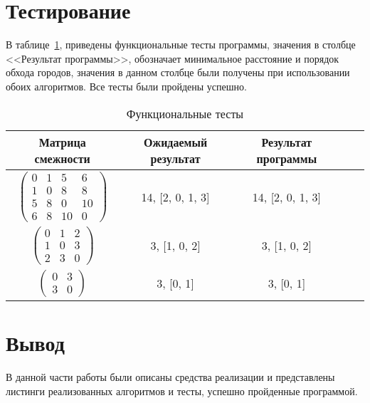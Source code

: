 \section{Тестирование}
В таблице~\ref{t:func_t}, приведены функциональные тесты программы,
значения в столбце <<Результат программы>>, обозначает минимальное расстояние и порядок обхода городов, значения в данном столбце были получены при использовании обоих алгоритмов. Все тесты были пройдены успешно.
\begin{center}
	\captionsetup{justification=raggedright,singlelinecheck=off}
	\begin{longtable}[c]{|c|c|c|c|c|}
		\caption{Функциональные тесты\label{t:func_t}} \\ \hline
		Матрица смежности & Ожидаемый результат & Результат программы \\
		\hline
		$ \begin{pmatrix}
		 0 &  1  & 5 &  6\\
		1  & 0  & 8  & 8\\
		5  & 8 &  0 & 10\\
		6  & 8 & 10 &  0
		
		\end{pmatrix}$ &
		14, [2, 0, 1, 3] &
		14, [2, 0, 1, 3] \\
		
		$ \begin{pmatrix}
			0 & 1 & 2 \\
			1 & 0 & 3 \\
			2 & 3 & 0	
		\end{pmatrix}$ &
		3, [1, 0, 2] &
		3, [1, 0, 2] \\
		
		$ \begin{pmatrix}
		 0 & 3\\
		 3 & 0
		\end{pmatrix}$ &
		3, [0, 1] &
		3, [0, 1] \\
		\hline
	\end{longtable}
\end{center}
	
\section*{Вывод}

В данной части работы были описаны средства реализации и представлены листинги реализованных алгоритмов и тесты, успешно пройденные программой.